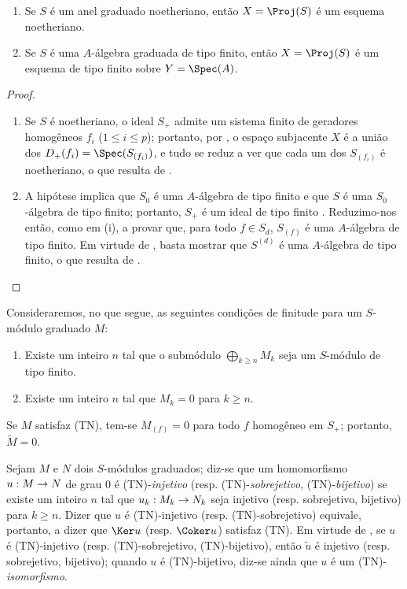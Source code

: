 \documentclass[oneside,10pt]{amsart}
\makeatletter
\renewcommand{\leq}{\leqslant}
\renewcommand{\geq}{\geqslant}
\newcommand{\ega@arrow}[2]{\mathchoice{#1}{#2}{#2}{#2}}
\renewcommand{\to}{\ega@arrow{\longrightarrow}{\rightarrow}}
\newcommand{\oldpage}[2][]{\marginnote{\normalfont\footnotesize\textbf{#1}~|~#2}\ignorespaces}
\let\EGAOriginalLabel\label
\renewcommand{\label}[1]{\phantomsection\EGAOriginalLabel{#1}}
\makeatother
\begin{document}
\begin{proposition}[2.7.1]
\label{II.2.7.1}
\begin{enumerate}
  \item[{\rm(i)}] Se $S$ é um anel graduado noetheriano, então $X=\Proj(S)$ é um esquema noetheriano.
  \item[{\rm(ii)}] Se $S$ é uma $A$-álgebra graduada de tipo finito, então $X=\Proj(S)$ é um esquema de tipo finito sobre $Y=\Spec(A)$.
\end{enumerate}
\end{proposition}
\oldpage[II]{39}
\begin{proof}
\medskip\noindent
\begin{enumerate}
  \item[{\rm(i)}] Se $S$ é noetheriano, o ideal $S_+$ admite um sistema finito de geradores homogêneos $f_i$ ($1\leq i\leq p$); portanto, por , o espaço subjacente $X$ é a união dos $D_+(f_i)=\Spec(S_{(f_i)})$, e tudo se reduz a ver que cada um dos $S_{(f_i)}$ é noetheriano, o que resulta de .
  \item[{\rm(ii)}] A hipótese implica que $S_0$ é uma $A$-álgebra de tipo finito e que $S$ é uma $S_0$-álgebra de tipo finito; portanto, $S_+$ é um ideal de tipo finito .
    Reduzimo-nos então, como em (i), a provar que, para todo $f\in S_d$, $S_{(f)}$ é uma $A$-álgebra de tipo finito.
    Em virtude de , basta mostrar que $S^{(d)}$ é uma $A$-álgebra de tipo finito, o que resulta de .
\end{enumerate}
\end{proof}

\begin{env}[2.7.2]
\label{II.2.7.2}
Consideraremos, no que segue, as seguintes condições de finitude para um $S$-módulo graduado $M$:
\begin{enumerate}
  \item[{\rm(TF)}] Existe um inteiro $n$ tal que o submódulo $\bigoplus_{k\geq n}M_k$ seja um $S$-módulo de tipo finito.
  \item[{\rm(TN)}] Existe um inteiro $n$ tal que $M_k=0$ para $k\geq n$.
\end{enumerate}

Se $M$ satisfaz (TN), tem-se $M_{(f)}=0$ para todo $f$ homogêneo em $S_+$; portanto, $\widetilde{M}=0$.

Sejam $M$ e $N$ dois $S$-módulos graduados; diz-se que um homomorfismo $u:M\to N$ de grau $0$ é (TN)-\emph{injetivo} (resp. (TN)-\emph{sobrejetivo}, (TN)-\emph{bijetivo}) se existe um inteiro $n$ tal que $u_k:M_k\to N_k$ seja injetivo (resp. sobrejetivo, bijetivo) para $k\geq n$.
Dizer que $u$ é (TN)-injetivo (resp. (TN)-sobrejetivo) equivale, portanto, a dizer que $\Ker u$ (resp. $\Coker u$) satisfaz (TN).
Em virtude de , se $u$ é (TN)-injetivo (resp. (TN)-sobrejetivo, (TN)-bijetivo), então $\widetilde{u}$ é injetivo (resp. sobrejetivo, bijetivo); quando $u$ é (TN)-bijetivo, diz-se ainda que $u$ é um (TN)-\emph{isomorfismo}.
\end{env}
\end{document}
